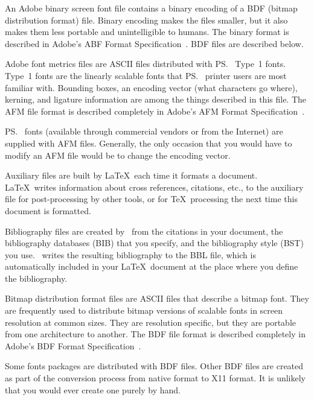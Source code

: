 \begin{iplist}{.25in}

\extitem [abf] An Adobe binary screen font file contains a binary encoding
of a BDF (bitmap distribution format) file.  Binary encoding makes the 
files smaller, but it also makes
them less portable and unintelligible to humans.  The binary format is
described in Adobe's ABF Format Specification~\cite{abffiles}.
BDF files are described below.

\extitem [afm] Adobe font metrics files are ASCII files distributed with
\ps\ Type~1 fonts.  Type~1 fonts are the linearly scalable fonts that
\ps\ printer users are most familiar with.  Bounding boxes, an encoding
vector (what characters go where),
kerning,
and
ligature
information
are among the things described in this file.  The AFM file format is
described completely in Adobe's AFM Format 
Specification~\cite{afmfiles}.

\ps\ fonts (available through commercial vendors or from the
Internet) are supplied with AFM files.  Generally, the only occasion
that you would have to modify an AFM file would be to change the
encoding vector.

\extitem [aux] Auxiliary files are built by \LaTeX\ each time it formats
a document.  \LaTeX\ writes information about cross references, citations,
etc., to the auxiliary file for post-processing by other tools, or
for \TeX\ processing the next time this document is formatted.

\newpage
\extitem [bbl] Bibliography files are created by \BibTeX\ from the citations in
your document, the bibliography databases (BIB) that you specify, and the
bibliography style (BST) you use.  \BibTeX\ writes the resulting
bibliography to the BBL file, which is automatically included in your \LaTeX\
document at the place where you define the bibliography.

\extitem [bdf] Bitmap distribution format files are ASCII files that describe
a bitmap font.  They are frequently used to distribute bitmap versions of
scalable fonts in screen resolution at common sizes.  They are resolution
specific, but they are portable from one architecture to another.  The BDF
file format is described completely in Adobe's BDF Format
Specification~\cite{bdffiles}.

Some fonts packages are distributed with BDF files.
Other BDF files are created as part of the conversion process from native
format to X11 format.  It is unlikely that you would ever create one purely
by hand.


\end{iplist}
